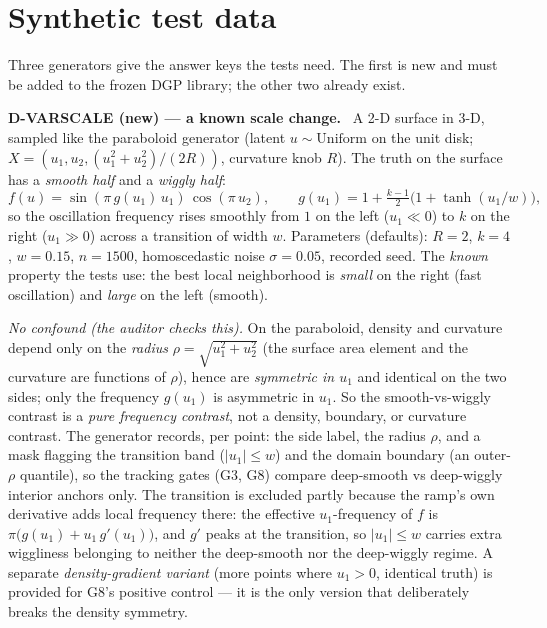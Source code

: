 \documentclass[11pt]{article}
\newcommand{\field}[1]{\smallskip\noindent\textbf{\textsf{#1.}}\ }
\begin{document}
\section{Synthetic test data}\label{sec:dgp}

Three generators give the answer keys the tests need. The first is new and must be
added to the frozen DGP library; the other two already exist.

\field{D-VARSCALE (new) --- a known scale change}
A 2-D surface in 3-D, sampled like the paraboloid generator (latent
$u\sim\text{Uniform}$ on the unit disk; $X=(u_1,u_2,(u_1^2+u_2^2)/(2R))$, curvature
knob $R$). The truth on the surface has a \emph{smooth half} and a \emph{wiggly half}:
\[
 f(u)=\sin(\pi\,g(u_1)\,u_1)\,\cos(\pi\,u_2),\qquad
 g(u_1)=1+\tfrac{k-1}{2}\big(1+\tanh(u_1/w)\big),
\]
so the oscillation frequency rises smoothly from $1$ on the left ($u_1\ll0$) to $k$ on
the right ($u_1\gg0$) across a transition of width $w$. Parameters (defaults):
$R=2$, $k=4$, $w=0.15$, $n=1500$, homoscedastic noise $\sigma=0.05$, recorded seed.
The \emph{known} property the tests use: the best local neighborhood is \emph{small}
on the right (fast oscillation) and \emph{large} on the left (smooth).

\smallskip\noindent\emph{No confound (the auditor checks this).} On the paraboloid, density
and curvature depend only on the \emph{radius} $\rho=\sqrt{u_1^2+u_2^2}$ (the surface area
element and the curvature are functions of $\rho$), hence are \emph{symmetric in $u_1$} and
identical on the two sides; only the frequency $g(u_1)$ is asymmetric in $u_1$. So the
smooth-vs-wiggly contrast is a \emph{pure frequency contrast}, not a density, boundary, or
curvature contrast. The generator records, per point: the side label, the radius $\rho$,
and a mask flagging the transition band ($|u_1|\le w$) and the domain boundary (an
outer-$\rho$ quantile), so the tracking gates (G3, G8) compare deep-smooth vs deep-wiggly
interior anchors only. The transition is excluded partly because the ramp's own derivative
adds local frequency there: the effective $u_1$-frequency of $f$ is
$\pi\big(g(u_1)+u_1\,g'(u_1)\big)$, and $g'$ peaks at the transition, so $|u_1|\le w$
carries extra wiggliness belonging to neither the deep-smooth nor the deep-wiggly regime. A
separate \emph{density-gradient variant} (more points where $u_1>0$, identical truth) is
provided for G8's positive control --- it is the only version that deliberately breaks the
density symmetry.
\end{document}
